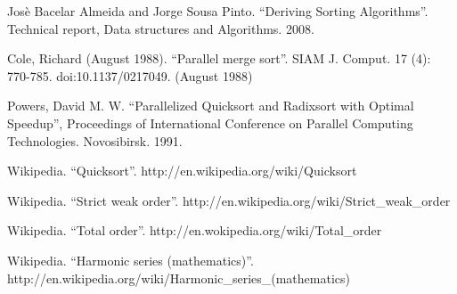\documentclass[UTF8]{article}
\begin{document}
\begin{thebibliography}{99}
Jos\`{e} Bacelar Almeida and Jorge Sousa Pinto. ``Deriving Sorting Algorithms''. Technical report, Data structures and Algorithms. 2008.

Cole, Richard (August 1988). ``Parallel merge sort''. SIAM J. Comput. 17 (4): 770-785. doi:10.1137/0217049. (August 1988)

Powers, David M. W. ``Parallelized Quicksort and Radixsort with Optimal Speedup'', Proceedings of International Conference on Parallel Computing Technologies. Novosibirsk. 1991.

Wikipedia. ``Quicksort''. http://en.wikipedia.org/wiki/Quicksort

Wikipedia. ``Strict weak order''. http://en.wikipedia.org/wiki/Strict\_weak\_order

Wikipedia. ``Total order''. http://en.wokipedia.org/wiki/Total\_order

Wikipedia. ``Harmonic series (mathematics)''. http://en.wikipedia.org/wiki/Harmonic\_series\_(mathematics)

\end{thebibliography}
\end{document}
